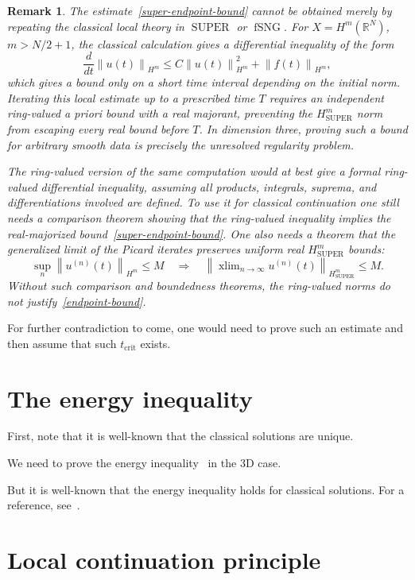 \documentclass{amsart}
\newtheorem{rem}{Remark}
\DeclareMathOperator{\xlim}{xlim}
\DeclareMathOperator{\SUPER}{SUPER}
\DeclareMathOperator{\fSNG}{fSNG}
\newcommand{\norm}[1]{\left\lVert #1\right\rVert}
\begin{document}
\begin{rem}
The estimate~\eqref{super-endpoint-bound} cannot be obtained merely by
repeating the classical local theory in $\SUPER$ or $\fSNG$.  For
$X=H^m(\mathbb{R}^N)$, $m>N/2+1$, the classical calculation gives a differential
inequality of the form
\[
  \frac{d}{dt}\norm{u(t)}_{H^m}
  \leq C\norm{u(t)}_{H^m}^2+\norm{f(t)}_{H^m},
\]
which gives a bound only on a short time interval depending on the initial
norm.  Iterating this local estimate up to a prescribed time $T$ requires an
independent ring-valued a priori bound with a real majorant, preventing the
$H^m_{\SUPER}$ norm from escaping every real bound before $T$.  In dimension
three, proving such a bound for arbitrary smooth data is precisely the
unresolved regularity problem.

The ring-valued version of the same computation would at best give a formal
ring-valued differential inequality, assuming all products, integrals, suprema,
and differentiations involved are defined.  To use it for classical
continuation one still needs a comparison theorem showing that the ring-valued
inequality implies the real-majorized bound~\eqref{super-endpoint-bound}.  One
also needs a theorem that the generalized limit of the Picard iterates
preserves uniform real $H^m_{\SUPER}$ bounds:
\[
  \sup_n\norm{u^{(n)}(t)}_{H^m}\leq M
  \quad\Longrightarrow\quad
  \norm{\xlim_{n\to\infty}u^{(n)}(t)}_{H^m_{\SUPER}}\leq M .
\]
Without such comparison and boundedness theorems, the ring-valued norms do not
justify~\eqref{endpoint-bound}.
\end{rem}

For further contradiction to come, one would need to prove such an estimate and
then assume that such $t_{\operatorname{crit}}$ exists.

\section{The energy inequality}

First, note that it is well-known that the classical solutions are unique.

We need to prove the energy inequality~\cite{navier-stokes-clay} in the 3D case.

But it is well-known that the energy inequality holds for classical solutions. For a reference, see~\cite{navier-stokes-energy}.

\section{Local continuation principle}
\end{document}
